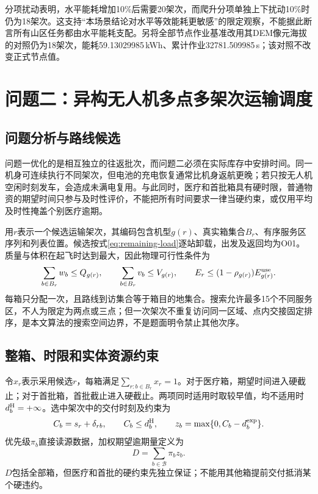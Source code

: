 \documentclass[a4paper]{my_paper}%
\numberwithin{equation}{section}
\theoremstyle{definition}
\begin{document}
分项扰动表明，水平能耗增加10\%后需要20架次，而爬升分项单独上下扰动10\%时仍为18架次。这支持“本场景结论对水平等效能耗更敏感”的限定观察，不能据此断言所有山区任务都由水平能耗支配。另将全部节点作业基准改用其DEM像元海拔的对照仍为18架次，能耗59.13029985\,kWh、累计作业32781.509985\,s；该对照不改变正式节点值。


\section{问题二：异构无人机多点多架次运输调度}
\subsection{问题分析与路线候选}
问题一优化的是相互独立的往返批次，而问题二必须在实际库存中安排时间。同一机身可连续执行不同架次，但电池的充电恢复通常比机身返航更晚；若只按无人机空闲时刻发车，会造成未满电复用。与此同时，医疗和首批箱具有硬时限，普通物资的期望时间只参与及时性评价，不能把所有时间要求一律当硬约束，或仅用平均及时性掩盖个别医疗逾期。

用$r$表示一个候选运输架次，其编码包含机型$g(r)$、真实箱集合$B_r$、有序服务区序列和列表位置。候选按式\eqref{eq:remaining-load}逐站卸载，出发及返回均为O01。质量与体积在起飞时达到最大，因此物理可行性条件为
\begin{equation}
 \sum_{b\in B_r}w_b\le Q_{g(r)},\qquad
 \sum_{b\in B_r}v_b\le V_{g(r)},\qquad
 E_r\le(1-\rho_{g(r)})E_{g(r)}^{\rm use}.
 \label{eq:q2capacity}
\end{equation}
每箱只分配一次，且路线到访集合等于箱目的地集合。搜索允许最多15个不同服务区，不人为限定为两点或三点；但一次架次不重复访问同一区域、点内交接固定排序，是本文算法的搜索空间边界，不是题面明令禁止其他次序。

\subsection{整箱、时限和实体资源约束}
令$x_r$表示采用候选$r$，每箱满足$\sum_{r:b\in B_r}x_r=1$。对于医疗箱，期望时间进入硬截止；对于首批箱，首批截止进入硬截止。两项同时适用时取较早值，均不适用时$d_b^{\rm H}=+\infty$。选中架次中的交付时刻及约束为
\begin{equation}
 C_b=s_r+\delta_{rb},\qquad C_b\le d_b^{\rm H},\qquad
 z_b=\max\{0,C_b-d_b^{\rm exp}\}.
 \label{eq:deadline}
\end{equation}
优先级$\pi_b$直接读源数据，加权期望逾期量定义为
\begin{equation}
 D=\sum_{b\in\mathcal B}\pi_b z_b.
 \label{eq:tardiness}
\end{equation}
$D$包括全部箱，但医疗和首批的硬约束先独立保证；不能用其他箱提前交付抵消某个硬违约。
\end{document}
